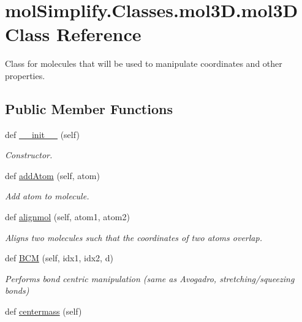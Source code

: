 \hypertarget{classmolSimplify_1_1Classes_1_1mol3D_1_1mol3D}{}\section{mol\+Simplify.\+Classes.\+mol3\+D.\+mol3D Class Reference}
\label{classmolSimplify_1_1Classes_1_1mol3D_1_1mol3D}


Class for molecules that will be used to manipulate coordinates and other properties.  


\subsection*{Public Member Functions}
\begin{DoxyCompactItemize}
\item 
def \hyperlink{classmolSimplify_1_1Classes_1_1mol3D_1_1mol3D_ad12e0f1f0f180b0ed25d8d9aee9e7a82}{\+\_\+\+\_\+init\+\_\+\+\_\+} (self)
\begin{DoxyCompactList}\small\item\em Constructor. \end{DoxyCompactList}\item 
def \hyperlink{classmolSimplify_1_1Classes_1_1mol3D_1_1mol3D_a444e22d04c8ec79f1b2ce77ee9e1e8fc}{add\+Atom} (self, atom)
\begin{DoxyCompactList}\small\item\em Add atom to molecule. \end{DoxyCompactList}\item 
def \hyperlink{classmolSimplify_1_1Classes_1_1mol3D_1_1mol3D_ab1d82358efa2110c56e1caf3ba9433e5}{alignmol} (self, atom1, atom2)
\begin{DoxyCompactList}\small\item\em Aligns two molecules such that the coordinates of two atoms overlap. \end{DoxyCompactList}\item 
def \hyperlink{classmolSimplify_1_1Classes_1_1mol3D_1_1mol3D_aa37a3e5878925148c6b6e38f6a6cf59c}{B\+CM} (self, idx1, idx2, d)
\begin{DoxyCompactList}\small\item\em Performs bond centric manipulation (same as Avogadro, stretching/squeezing bonds) \end{DoxyCompactList}\item 
def \hyperlink{classmolSimplify_1_1Classes_1_1mol3D_1_1mol3D_ac2341892da1c1333802cda42da7cca3e}{centermass} (self)

\end{DoxyCompactItemize}
